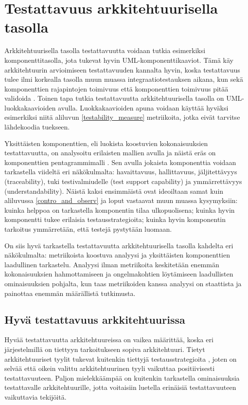 \documentclass[finnish]{tktltiki2}
\numberwithin{table}{section}
\theoremstyle{definition}
\theoremstyle{remark}
\begin{document}
\section{Testattavuus arkkitehtuurisella tasolla} \label{arch_testability_main}

Arkkitehtuurisella tasolla testattavuutta voidaan tutkia esimerkiksi komponenttitasolla, jota tukevat hyvin UML-komponenttikaaviot. Tämä käy arkkitehtuurin arvioimiseen testattavuuden kannalta hyvin, koska testattavuus tulee ilmi korkealla tasolla muun muassa integraatiotestauksen aikana, kun sekä komponenttien rajapintojen toimivuus että komponenttien toimivuus pitää validoida \citep[s. 65]{Eickelmann:1996:MOS:243327.243602}. Toinen tapa tutkia testattavuutta arkkitehtuurisella tasolla on UML-luokkakaavioiden avulla. Luokkakaavioiden apuna voidaan käyttää hyväksi esimerkiksi niitä aliluvun \ref{testability_measure} metriikoita, jotka eivät tarvitse lähdekoodia tuekseen. 

Yksittäisten komponenttien, eli luokista koostuvien kokonaisuuksien testattavuutta, on analysoitu erilaisten mallien avulla ja näistä eräs on komponenttien pentagrammimalli \citep{gao_component_2005}. Sen avulla jokaista komponenttia voidaan tarkastella viideltä eri näkökulmalta: havaittavuus, hallittavuus, jäljitettävyys (traceability), tuki testivalmiudelle (test support capability) ja ymmärrettävyys (understandability). Näistä kaksi ensimmäistä ovat ideoiltaan samat kuin aliluvussa \ref{contro_and_observ} ja loput vastaavat muun muassa kysymyksiin: kuinka helppoa on tarkastella komponentin tilaa ulkopuolisena; kuinka hyvin komponentti tukee erilaisia testausstrategioita; kuinka hyvin komponentin tarkoitus ymmärretään, että testejä pystytään luomaan. 
 
On siis hyvä tarkastella testattavuutta arkkitehtuurisella tasolla kahdelta eri näkökulmalta: metriikoista koostuva analyysi ja yksittäisten komponenttien laadullinen tarkastelu. Analyysi ilman metriikoita keskitetään enemmän kokonaisuuksien hahmottamiseen ja ongelmakohtien löytämiseen laadullisten ominaisuuksien pohjalta, kun taas metriikoiden kanssa analyysi on staattista ja painottaa enemmän määrällistä tutkimusta.


\subsection{Hyvä testattavuus arkkitehtuurissa} \label{good_testability}

 
Hyvää testattavuutta arkkitehtuureissa on vaikea määrittää, koska eri järjestelmillä on tiettyyn tarkoitukseen sopiva arkkitehtuuri. Tietyt arkkitehtuuriset tyylit tukevat kuitenkin tiettyjä testausstrategioita \citep{Eickelmann:1996:MOS:243327.243602}, joten on selvää että oikein valittu arkkitehtuurinen tyyli vaikuttaa positiivisesti testattavuuteen. Paljon mielekkäämpää on kuitenkin tarkastella  ominaisuuksia testattavalle arkkitehtuurille, jotta voitaisiin luetella erinäisiä testattavuuteen vaikuttavia tekijöitä.
\end{document}

